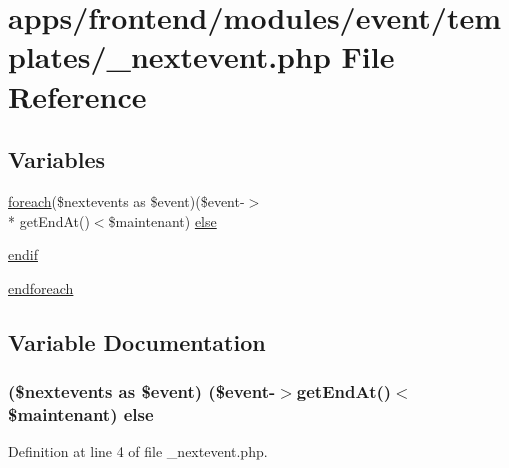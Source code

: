 \hypertarget{frontend_2modules_2event_2templates_2__nextevent_8php}{\section{apps/frontend/modules/event/templates/\-\_\-nextevent.php File Reference}
\label{frontend_2modules_2event_2templates_2__nextevent_8php}
}
\subsection*{Variables}
\begin{DoxyCompactItemize}
\item 
\hyperlink{presse_2modules_2news_2templates_2index_success_8php_abc56db52b2e9a59bcd5c9e45ac5cb332}{foreach}(\$nextevents as \$event)(\$event-\/$>$\\*
get\-End\-At()$<$\$maintenant) \hyperlink{frontend_2modules_2event_2templates_2__nextevent_8php_a9be22ad6cfbc26d33c7d6633e0b7a8aa}{else}
\item 
\hyperlink{frontend_2modules_2event_2templates_2__nextevent_8php_a82cd33ca97ff99f2fcc5e9c81d65251b}{endif}
\item 
\hyperlink{frontend_2modules_2event_2templates_2__nextevent_8php_a672d9707ef91db026c210f98cc601123}{endforeach}
\end{DoxyCompactItemize}


\subsection{Variable Documentation}
\hypertarget{frontend_2modules_2event_2templates_2__nextevent_8php_a9be22ad6cfbc26d33c7d6633e0b7a8aa}{
\subsubsection[{else}]{ (\$nextevents as \$event) (\$event-\/$>$get\-End\-At()$<$\$maintenant) else}}\label{frontend_2modules_2event_2templates_2__nextevent_8php_a9be22ad6cfbc26d33c7d6633e0b7a8aa}


Definition at line 4 of file \-\_\-nextevent.\-php.

